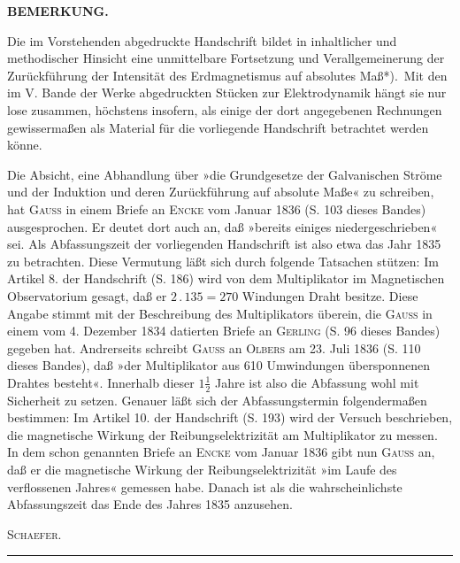 \clearpage\begingroup
{}
\begin{center}\textbf{BEMERKUNG.}\end{center}
\noindent\hspace*{\parindent}Die im Vorstehenden abgedruckte Handschrift bildet in inhaltlicher und methodischer Hinsicht eine unmittelbare Fortsetzung und Verallgemeinerung der Zurückführung der Intensität des Erdmagnetismus auf absolutes Maß*).\begingroup\renewcommand{\thefootnote}{}\endgroup\ Mit den im V. Bande der Werke abgedruckten Stücken zur Elektrodynamik hängt sie nur lose zusammen, höchstens insofern, als einige der dort angegebenen Rechnungen gewissermaßen als Material für die vorliegende Handschrift betrachtet werden könne.

Die Absicht, eine Abhandlung über »die Grundgesetze der Galvanischen Ströme und der Induktion und deren Zurückführung auf absolute Maße« zu schreiben, hat \textsc{Gauss} in einem Briefe an \textsc{Encke} vom Januar 1836 (S. 103 dieses Bandes) ausgesprochen. Er deutet dort auch an, daß »bereits einiges niedergeschrieben« sei. Als Abfassungszeit der vorliegenden Handschrift ist also etwa das Jahr 1835 zu betrachten. Diese Vermutung läßt sich durch folgende Tatsachen stützen: Im Artikel 8. der Handschrift (S. 186) wird von dem Multiplikator im Magnetischen Observatorium gesagt, daß er $2\mathbin{.}135=270$ Windungen Draht besitze. Diese Angabe stimmt mit der Beschreibung des Multiplikators überein, die \textsc{Gauss} in einem vom 4. Dezember 1834 datierten Briefe an \textsc{Gerling} (S. 96 dieses Bandes) gegeben hat. Andrerseits schreibt \textsc{Gauss} an \textsc{Olbers} am 23. Juli 1836 (S. 110 dieses Bandes), daß »der Multiplikator  aus 610 Umwindungen übersponnenen Drahtes besteht«. Innerhalb dieser $1\frac12$ Jahre ist also die Abfassung wohl mit Sicherheit zu setzen. Genauer läßt sich der Abfassungstermin folgendermaßen bestimmen: Im Artikel 10. der Handschrift (S. 193) wird der Versuch beschrieben, die magnetische Wirkung der Reibungselektrizität am Multiplikator zu messen. In dem schon genannten Briefe an \textsc{Encke} vom Januar 1836 gibt nun \textsc{Gauss} an, daß er die magnetische Wirkung der Reibungselektrizität »im Laufe des verflossenen Jahres« gemessen habe. Danach ist als die wahrscheinlichste Abfassungszeit das Ende des Jahres 1835 anzusehen.
\begin{flushright}\textsc{Schaefer.}\end{flushright}
\begin{center}\rule{.24\textwidth}{.35pt}\end{center}
\clearpage\endgroup
